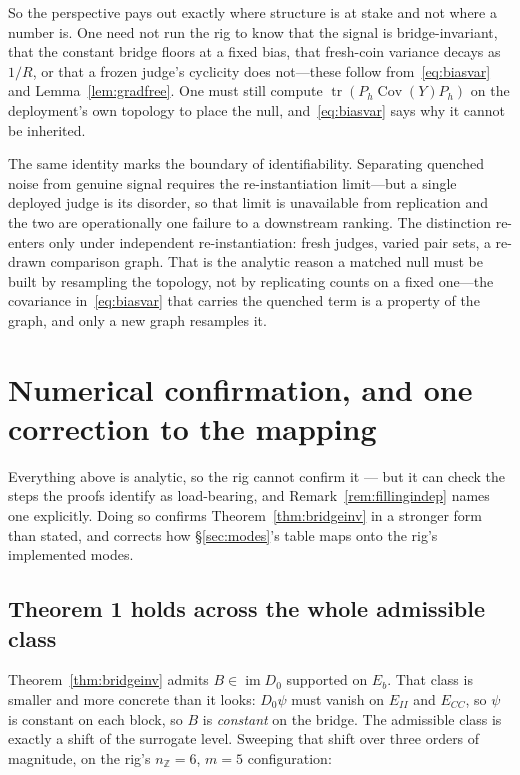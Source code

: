 \documentclass[11pt,a4paper]{article}
\theoremstyle{definition}
\theoremstyle{remark}
\newcommand{\Z}{\mathbb{Z}}
\newcommand{\im}{\operatorname{im}}
\newcommand{\Cov}{\operatorname{Cov}}
\newcommand{\tr}{\operatorname{tr}}
\newcommand{\Ph}{P_h}
\begin{document}
So the perspective pays out exactly where structure is at stake and not where a number is. One need not run the rig to know that the signal is bridge-invariant, that the constant bridge floors at a fixed bias, that fresh-coin variance decays as $1/R$, or that a frozen judge's cyclicity does not---these follow from~\eqref{eq:biasvar} and Lemma~\ref{lem:gradfree}. One must still compute $\tr(\Ph\Cov(Y)\Ph)$ on the deployment's own topology to place the null, and~\eqref{eq:biasvar} says why it cannot be inherited.

The same identity marks the boundary of identifiability. Separating quenched noise from genuine signal requires the re-instantiation limit---but a single deployed judge is its disorder, so that limit is unavailable from replication and the two are operationally one failure to a downstream ranking. The distinction re-enters only under independent re-instantiation: fresh judges, varied pair sets, a re-drawn comparison graph. That is the analytic reason a matched null must be built by resampling the topology, not by replicating counts on a fixed one---the covariance in~\eqref{eq:biasvar} that carries the quenched term is a property of the graph, and only a new graph resamples it.

\section{Numerical confirmation, and one correction to the mapping}\label{sec:numconf}

Everything above is analytic, so the rig cannot confirm it --- but it can check
the steps the proofs identify as load-bearing, and Remark~\ref{rem:fillingindep} names one
explicitly. Doing so confirms Theorem~\ref{thm:bridgeinv} in a stronger form than stated, and
corrects how \S\ref{sec:modes}'s table maps onto the rig's implemented modes.

\subsection{Theorem 1 holds across the whole admissible class}\label{subsec:invar}

Theorem~\ref{thm:bridgeinv} admits $B\in\im D_0$ supported on $E_b$. That class is smaller and more
concrete than it looks: $D_0\psi$ must vanish on $E_{II}$ and $E_{CC}$, so $\psi$
is constant on each block, so $B$ is \emph{constant} on the bridge. The admissible
class is exactly a shift of the surrogate level. Sweeping that shift over three
orders of magnitude, on the rig's $n_{\Z}=6$, $m=5$ configuration:
\end{document}
